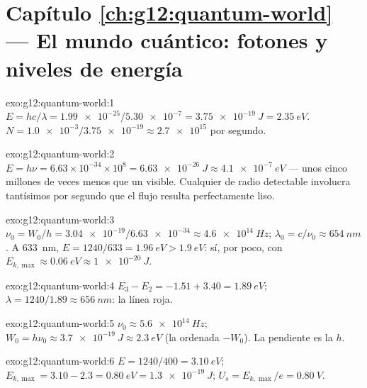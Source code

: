 \section*{Capítulo \ref{ch:g12:quantum-world} --- El mundo cuántico: fotones y niveles de energía}

\begin{solution}{exo:g12:quantum-world:1}
$E = hc/\lambda = \num{1.99e-25}/\num{5.30e-7} = \qty{3.75e-19}{J} =
\qty{2.35}{eV}$.
$N = \num{1.0e-3}/\num{3.75e-19} \approx \num{2.7e15}$  por
segundo.
\end{solution}

\begin{solution}{exo:g12:quantum-world:2}
$E = h\nu = 6.63\times10^{-34} \times 10^{8} = \qty{6.63e-26}{J}
\approx \qty{4.1e-7}{eV}$ --- unos cinco millones de veces menos que un
 visible. Cualquier  de radio detectable involucra tantísimos
 por segundo que el flujo resulta perfectamente liso.
\end{solution}

\begin{solution}{exo:g12:quantum-world:3}
$\nu_0 = W_0/h = \num{3.04e-19}/\num{6.63e-34} \approx
\qty{4.6e14}{Hz}$; $\lambda_0 = c/\nu_0 \approx \qty{654}{nm}$. A
\qty{633}{nm}, $E = 1240/633 = \qty{1.96}{eV} > \qty{1.9}{eV}$: sí, por
poco, con $E_{k,\max} \approx \qty{0.06}{eV} \approx \qty{1e-20}{J}$.
\end{solution}

\begin{solution}{exo:g12:quantum-world:4}
$E_3 - E_2 = -1.51 + 3.40 = \qty{1.89}{eV}$;
$\lambda = 1240/1.89 \approx \qty{656}{nm}$: la línea roja.
\end{solution}

\begin{solution}{exo:g12:quantum-world:5}
$\nu_0 \approx \qty{5.6e14}{Hz}$;
$W_0 = h\nu_0 \approx \qty{3.7e-19}{J} \approx \qty{2.3}{eV}$ (la
ordenada $-W_0$). La pendiente es la  $h$.
\end{solution}

\begin{solution}{exo:g12:quantum-world:6}
$E = 1240/400 = \qty{3.10}{eV}$;
$E_{k,\max} = 3.10 - 2.3 = \qty{0.80}{eV} = \qty{1.3e-19}{J}$;
$U_s = E_{k,\max}/e = \qty{0.80}{V}$.
\end{solution}

